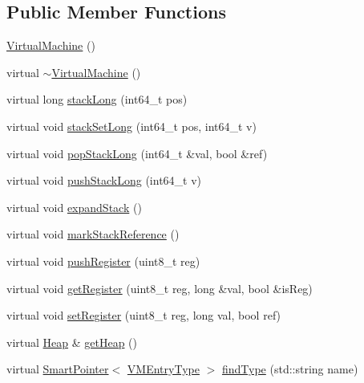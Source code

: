 \subsection*{Public Member Functions}
\begin{DoxyCompactItemize}
\item 
\hyperlink{class_v_m_1_1_virtual_machine_a599190c44c7f389f00161ac0b7c967be}{Virtual\-Machine} ()
\item 
virtual \hyperlink{class_v_m_1_1_virtual_machine_a9fa555bfe2a4f5e21f527252a6d2aafa}{$\sim$\-Virtual\-Machine} ()
\item 
virtual long \hyperlink{class_v_m_1_1_virtual_machine_a921410c92816e435c186ca5298b72bdd}{stack\-Long} (int64\-\_\-t pos)
\item 
virtual void \hyperlink{class_v_m_1_1_virtual_machine_a59e82138e4b6ffcaa63ba24948e463fb}{stack\-Set\-Long} (int64\-\_\-t pos, int64\-\_\-t v)
\item 
virtual void \hyperlink{class_v_m_1_1_virtual_machine_a894cb6bba41d689f7efe9d96b1169348}{pop\-Stack\-Long} (int64\-\_\-t \&val, bool \&ref)
\item 
virtual void \hyperlink{class_v_m_1_1_virtual_machine_a2e71b42c4b71774c38c068fac038ce86}{push\-Stack\-Long} (int64\-\_\-t v)
\item 
virtual void \hyperlink{class_v_m_1_1_virtual_machine_a823add4bb2eb056811ab17cdae1840e5}{expand\-Stack} ()
\item 
virtual void \hyperlink{class_v_m_1_1_virtual_machine_a16e26b2033eb8a2689a29759aa864c7a}{mark\-Stack\-Reference} ()
\item 
virtual void \hyperlink{class_v_m_1_1_virtual_machine_a5bf3b52879bae8c9199733031840a74d}{push\-Register} (uint8\-\_\-t reg)
\item 
virtual void \hyperlink{class_v_m_1_1_virtual_machine_a3a756619c328ac943a982bdfc6a31aeb}{get\-Register} (uint8\-\_\-t reg, long \&val, bool \&is\-Reg)
\item 
virtual void \hyperlink{class_v_m_1_1_virtual_machine_af4da2b5077db8bad2574b35bc1a2bb31}{set\-Register} (uint8\-\_\-t reg, long val, bool ref)
\item 
virtual \hyperlink{class_v_m_1_1_heap}{Heap} \& \hyperlink{class_v_m_1_1_virtual_machine_a30fb1469c9f436093c06529b257abfb8}{get\-Heap} ()
\item 
virtual \hyperlink{_smart_pointer_8hpp_afdd8d4ba81c3fcbdeacf1dafba2accfb}{Smart\-Pointer}$<$ \hyperlink{class_v_m_1_1_v_m_entry_type}{V\-M\-Entry\-Type} $>$ \hyperlink{class_v_m_1_1_virtual_machine_a7b26ef866e71358c8ffd4ea133bd15c6}{find\-Type} (std\-::string name)

\end{DoxyCompactItemize}
